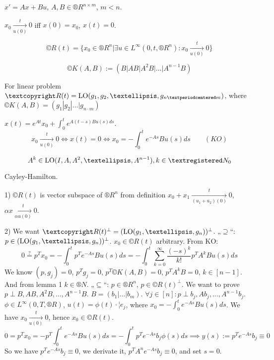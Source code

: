 \documentclass[12pt]{article}					%
\begin{document}
\begin{definice}
	$x' = Ax + Bu$, $A, B \in ®R^{n \times m}$, $m < n$.
\end{definice}

\begin{definice}
	$x_0 \underset{u(0)}{\overset{t}\rightarrow} 0$ iff $x(0) = x_0$, $x(t) = 0$.
\end{definice}

\newcommand{\converg}{\underset{u(0)}{\overset{t}\rightarrow}}
\begin{definice}
	$$ ©R(t) = \{x_0 \in ®R^n | \exists u \in L^∞(0, t, ®R^n): x_0 \underset{u(0)}{\overset{t}\rightarrow} 0 \} $$
\end{definice}

\begin{definice}
	$$ ©K(A, B) := (B | AB | A^2B | … | A^{n-1}B) $$
\end{definice}

\begin{veta}
	For linear problem $©R(t) = \LO (g_1, g_2, …, g_{n·m})$, where $©K(A, B) = (g_1 | g_2 | … | g_{n·m})$

	\begin{tvrzeniin}[Observation]
		$x(t) = e^{At} x_0 + \int_0^t e^{A(t - s) B u(s) ds}$.
		$$ x_0 \converg 0 \Leftrightarrow x(t) = 0 \Leftrightarrow x_0 = - \int_0^t e^{-A s} B u(s) ds \qquad (KO) $$
	\end{tvrzeniin}

	\begin{lemmain}[1]
		$$ A^k \in \LO(I, A, A^2, …, A^{n - 1}), k \in ®N_0 $$

		\begin{dukazin}
			Cayley-Hamilton.
		\end{dukazin}
	\end{lemmain}

	\begin{dukazin}
		1) $©R(t)$ is vector subspace of $®R^n$ from definition $x_0 + x_1 \underset{(u_1 + u_2)(0)}{\overset{t}\rightarrow} 0$, $\alpha x \underset{\alpha u(0)}{\overset{t}\rightarrow} 0$.

		2) We want $©R(t)^\perp = (\LO(g_1, …, g_n))^\perp$. „$\supseteq$“: $p \in (\LO(g_1, …, g_n))^\perp$. $x_0 \in ©R(t)$ arbitrary. From KO:
		$$ 0 \overset?= p^T x_0 = -\int_0^t p^Te^{-As} B u(s) ds = - \int_0^t \sum_{k=0}^∞ \frac{(-s)^k}{k!} p^T A^k B u(s) ds$$
		We know $(p, g_j) = 0$, $p^Tg_j = 0$, $p^T ©K(A, B) = 0$, $p^T A^k B = 0$, $k \in [n-1]$. And from lemma 1 $k \in ®N$.
		„$\subseteq$“: $p \in ®R^n$, $p \in ©R(t)^\perp$. We want to prove $p \perp B, AB, A^2B, …, A^{n-1}B$. $B = (b_1 | … | b_m)$. $\forall j \in [n]: p \perp b_j, Ab_j, …, A^{n-1}b_j$. $\phi \in L^∞(0, T, ®R)$, $u(t) = \phi(t)·¦e_j$, where $x_0 = - \int_0^t e^{-A s} B u(s) ds$. We have $x_0 \converg 0$, hence $x_0 \in ©R(t)$.
		$$ 0 = p^T x_0 = - p^T\int_0^t e^{-As} B u(s) ds = - \int_0^t p^T e^{-As}b_j \phi(s) ds \implies y(s) := p^T e^{-As}b_j ≡ 0 $$
		So we have $p^T e^{-As} b_j ≡ 0$, we derivate it, $p^T A^n e^{-As} b_j ≡ 0$, and set $s = 0$.
	\end{dukazin}
\end{veta}
\end{document}

